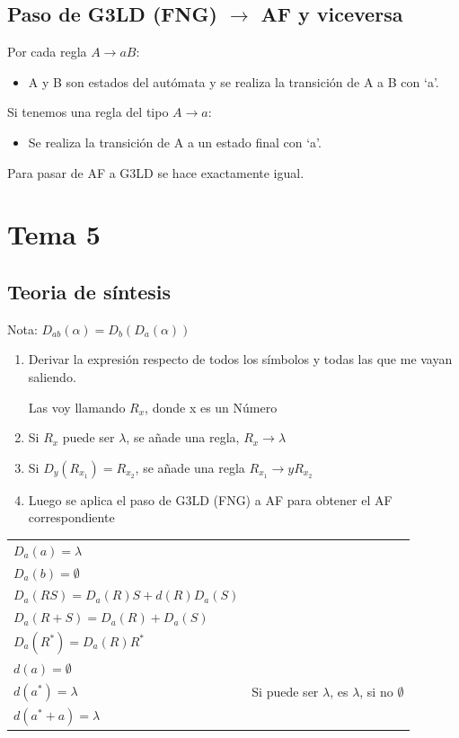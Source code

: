 \documentclass[12pt, twoside, openright]{report} %
\begin{document}
\subsection{Paso de G3LD (FNG) $\boldsymbol{\rightarrow}$ AF y viceversa}
Por cada regla $A \rightarrow aB$:
\begin{itemize}
	\item A y B son estados del autómata y se realiza la transición de A a B con ‘a’.
\end{itemize}
Si tenemos una regla del tipo $A \rightarrow a$:
\begin{itemize}
	\item Se realiza la transición de A a un estado final con ‘a’.
\end{itemize}
Para pasar de AF a G3LD se hace exactamente igual.

\section{Tema 5}
\subsection{Teoria de síntesis}
Nota: $D_{ab}(\alpha)= D_b(D_a(\alpha))$
\begin{enumerate}
	\item Derivar la expresión respecto de todos los símbolos y todas las que me vayan saliendo.

	      Las voy llamando $R_x$, donde x es un Número
	\item Si $R_x$ puede ser $\lambda$, se añade una regla, $R_x \rightarrow \lambda$
	\item Si $D_y(R_{x_1}) = R_{x_2}$, se añade una regla $R_{x_1} \rightarrow y R_{x_2}$
	\item Luego se aplica el paso de G3LD (FNG) a AF para obtener el AF correspondiente
\end{enumerate}
\begin{table}[H]
	\centering\begin{tabular}{ll}
		$D_a(a) = \lambda$ \\
		$D_a(b) = \emptyset$ \\
		$D_a(RS) = D_a(R)S + d(R)D_a(S)$ \\
		$D_a(R+S) = D_a(R) + D_a(S)$ \\
		$D_a(R^*) = D_a(R)R^*$ \\
		$d(a) = \emptyset$ \\
		$d(a^*) = \lambda$ & Si puede ser $\lambda$, es $\lambda$, si no $\emptyset$ \\
		$d(a^*+a) = \lambda$ \\
	\end{tabular}
\end{table}
\end{document}
